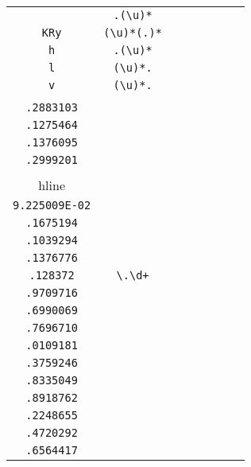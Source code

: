 \begin{longtable}{cccccccc}
\begin{tabular}{ll}
    \verb|vN| & \verb|.(\u)*|\\
\verb|KRy| & \verb|(\u)*(.)*|\\
\verb|h| & \verb|.(\u)*|\\
\verb|l| & \verb|(\u)*.|\\
\verb|v| & \verb|(\u)*.|
\end{tabular}
\\\midrule 
\begin{tabular}{l}
    \verb|.1301411|\\
\verb|.2883103|\\
\verb|.1275464|\\
\verb|.1376095|\\
\verb|.2999201|\\
\\hline\\
\verb|9.225009E-02|\\
\verb|.1675194|\\
\verb|.1039294|\\
\verb|.1376776|\\
\verb|.128372|
\end{tabular}

&
\verb|\.\d+|
&

\begin{tabular}{l}
    \verb|\.\d\d\d\d\d\d\d|\\
\verb|.9709716|\\
\verb|.6990069|\\
\verb|.7696710|\\
\verb|.0109181|\\
\verb|.3759246|
\end{tabular}

&

\begin{tabular}{l}
    \verb|\.\d\d\d\d\d\d\d|\\
\verb|.8335049|\\
\verb|.8918762|\\
\verb|.2248655|\\
\verb|.4720292|\\
\verb|.6564417|
\end{tabular}

&


\end{longtable}
